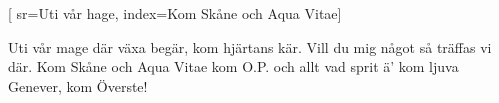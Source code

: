 [ 							
	sr={Uti vår hage},
	index={Kom Skåne och Aqua Vitae}]		
	
\beginverse*						
Uti vår mage där växa begär,
kom hjärtans kär.
Vill du mig något så träffas vi där. 
Kom Skåne och Aqua Vitae
kom O.P. och allt vad sprit ä'
kom ljuva Genever, kom Överste! 
\endverse				

\vspace{5mm}						
\endsong		
